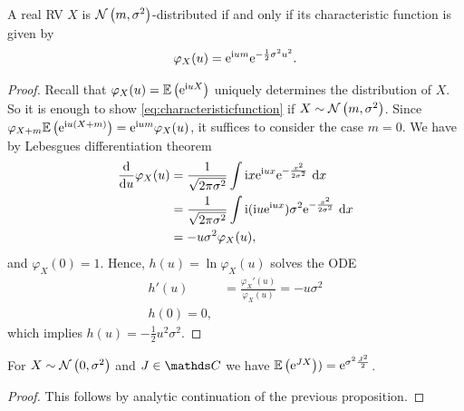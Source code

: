 \begin{prop}
A real RV $X$ is $\mathcal{N}\left(m,\sigma^2\right)$-distributed if and only if
its characteristic function is given by
\begin{align}\label{eq:characteristicfunction}
\varphi_X(u)=\mathrm{e}^{\mathrm{i} um}\mathrm{e}^{-\frac{1}{2}\sigma^2u^2}.
\end{align}
\begin{proof}
Recall that $\varphi_X(u)=\mathbb{E}\left(\mathrm{e}^{\mathrm{i} uX}\right)$ uniquely determines the distribution of $X$.
So it is enough to show \eqref{eq:characteristicfunction} if
$X\sim \mathcal{N}\left(m,\sigma^2\right)$.
Since $\varphi_{X+m}\mathbb{E}\left(\mathrm{e}^{\mathrm{i} u(X+m)}\right)=\mathrm{e}^{\mathrm{i} um}\varphi_X(u)$,
it suffices to consider the case $m=0$. We have by Lebesgues differentiation theorem
\begin{align*}
\frac{\mathrm{d}}{\mathrm{d}u}\varphi_X(u)&=\frac{1}{\sqrt{2\pi \sigma^2}} \int \mathrm{i} x\mathrm{e}^{\mathrm{i} ux}\mathrm{e}^{-\frac{x^2}{2 \sigma^2}}~\mathrm{d}x\\
&=\frac{1}{\sqrt{2 \pi \sigma^2}} \int \mathrm{i} (\mathrm{i} u \mathrm{e}^{\mathrm{i} ux})\sigma^2 \mathrm{e}^{-\frac{x^2}{2 \sigma^2}}~\mathrm{d}x\\
&=-u \sigma^2 \varphi_X(u),
\end{align*}
and $\varphi_X(0)=1$. Hence, $h(u)=\ln \varphi_X(u)$ solves the ODE
\begin{align*}
h'(u)&=\frac{\varphi_X'(u)}{\varphi_X(u)}=-u \sigma^2\\
h(0)=0,
\end{align*}
which implies $h(u)=-\frac{1}{2}u^2\sigma^2$.
\end{proof}
\end{prop}

\begin{cor}
For $X \sim \mathcal{N}\left(0,\sigma^2\right)$ and $J\in \C$ we have $\mathbb{E}\left(\mathrm{e}^{JX}\right))=\mathrm{e}^{\sigma^2 \frac{J^2}{2}}$.
\begin{proof}
This follows by analytic continuation of the previous proposition.
\end{proof}
\end{cor}

